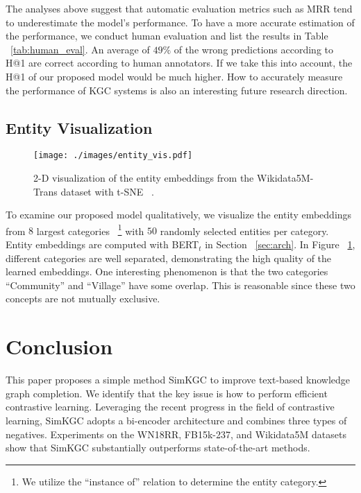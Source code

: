 \documentclass[11pt]{article}
\begin{document}
The analyses above suggest that
automatic evaluation metrics such as MRR tend to underestimate the model's performance.
To have a more accurate estimation of the performance,
we conduct human evaluation and list the results in Table ~\ref{tab:human_eval}.
An average of $49\%$ of the wrong predictions according to H@1 are correct according to human annotators.
If we take this into account,
the H@1 of our proposed model would be much higher.
How to accurately measure the performance of KGC systems
is also an interesting future research direction.

\subsection{Entity Visualization}

\begin{figure}[ht]
\begin{center}
 \texttt{[image: ./images/entity\_vis.pdf]}
 \caption{2-D visualization of the entity embeddings
 from the Wikidata5M-Trans dataset with t-SNE ~\citep{Maaten2008VisualizingDU}.}
 \label{fig:entity_vis}
\end{center}
\end{figure}

To examine our proposed model qualitatively,
we visualize the entity embeddings from $8$ largest categories
~\footnote{We utilize the ``instance of'' relation to determine the entity category.}
with $50$ randomly selected entities per category.
Entity embeddings are computed with BERT$_t$ in Section ~\ref{sec:arch}.
In Figure ~\ref{fig:entity_vis},
different categories are well separated,
demonstrating the high quality of the learned embeddings.
One interesting phenomenon is that
the two categories ``Community'' and ``Village'' have some overlap.
This is reasonable since these two concepts are not mutually exclusive.

\section{Conclusion}
This paper proposes a simple method SimKGC
to improve text-based knowledge graph completion.
We identify that the key issue is how to perform efficient contrastive learning.
Leveraging the recent progress in the field of contrastive learning,
SimKGC adopts a bi-encoder architecture
and combines three types of negatives.
Experiments on the WN18RR, FB15k-237, and Wikidata5M datasets
show that SimKGC substantially outperforms state-of-the-art methods.
\end{document}
